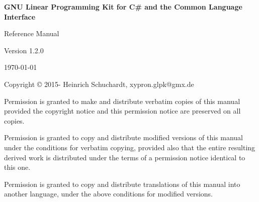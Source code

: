 \documentclass[a4paper,11pt]{report}
\newcommand{\glpkCliVersion}{1.2.0}
\begin{document}

\thispagestyle{empty}

\begin{center}

\vspace*{1in}

\begin{huge}
\sf\bfseries GNU Linear Programming Kit\linebreak
for C\# and the Common Language Interface
\end{huge}

\vspace{0.5in}

\begin{LARGE}
\sf Reference Manual
\end{LARGE}

\vspace{0.5in}

\begin{LARGE}
\sf Version \glpkCliVersion
\end{LARGE}

\vspace{0.5in}
\begin{Large}
\sf \today
\end{Large}
\end{center}

\newpage

\vspace*{1in}

\vfill

\medskip \noindent
Copyright \copyright{} 2015-{\the\year} Heinrich Schuchardt,
xypron.glpk@gmx.de

\medskip \noindent
Permission is granted to make and distribute verbatim copies of this
manual provided the copyright notice and this permission notice are
preserved on all copies.

\medskip \noindent
Permission is granted to copy and distribute modified versions of this
manual under the conditions for verbatim copying, provided also that the
entire resulting derived work is distributed under the terms of
a permission notice identical to this one.

\medskip \noindent
Permission is granted to copy and distribute translations of this manual
into another language, under the above conditions for modified versions.
\end{document}
